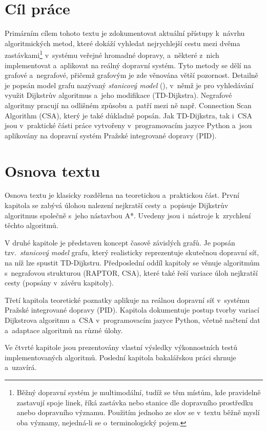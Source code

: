 \section*{Cíl práce}
Primárním cílem tohoto textu je zdokumentovat aktuální přístupy k~návrhu algoritmických metod, které dokáží vyhledat nejrychlejší cestu mezi dvěma zastávkami\footnote{Běžný dopravní systém je multimodální, tudíž se těm místům, kde pravidelně zastavují spoje linek, říká zastávka nebo stanice dle dopravního prostředku anebo dopravního významu. Použitím jednoho ze slov se v~textu běžně myslí oba významy, nejedná-li se o~terminologický pojem.} v~systému veřejné hromadné dopravy, a~některé z~nich implementovat a~aplikovat na reálný dopravní systém. Tyto metody se dělí na grafové a~negrafové, přičemž grafovým je zde věnována větší pozornost. Detailně je popsán model grafu nazývaný \textit{stanicový model} (), v~němž je pro vyhledávání využit Dijkstrův algoritmus a~jeho modifikace (TD-Dijkstra). Negrafové algoritmy pracují na odlišném způsobu a~patří mezi ně např. Connection Scan Algorithm (CSA), který je také důkladně popsán. Jak TD-Dijkstra, tak i~CSA jsou v~praktické části práce vytvořeny v~programovacím jazyce Python a~jsou aplikovány na dopravní systém Pražské integrované dopravy (PID). 

\section*{Osnova textu}
Osnova textu je klasicky rozdělena na teoretickou a~praktickou část. První kapitola se zabývá úlohou nalezení nejkratší cesty a~popisuje Dijkstrův algoritmus společně s~jeho nástavbou A*. Uvedeny jsou i~nástroje k~zrychlení těchto algoritmů.

V druhé kapitole je představen koncept časově závislých grafů. Je popsán tzv.~\textit{stanicový model} grafu, který realisticky reprezentuje skutečnou dopravní síť, na níž lze spustit TD-Dijkstru. Předposlední oddíl kapitoly se věnuje algoritmům s~negrafovou strukturou (RAPTOR, CSA), které také řeší variace úloh nejkratší cesty (popsány v~závěru kapitoly).

Třetí kapitola teoretické poznatky aplikuje na reálnou dopravní síť v~systému Pražské integrované dopravy (PID). Kapitola dokumentuje postup tvorby variací Dijkstrova algoritmu a~CSA v~programovacím jazyce Python, včetně načtení dat a~adaptace algoritmů na různé úlohy.

Ve čtvrté kapitole jsou prezentovány vlastní výsledky výkonnostních testů implementovaných algoritmů. Poslední kapitola bakalářskou práci shrnuje a~uzavírá.

